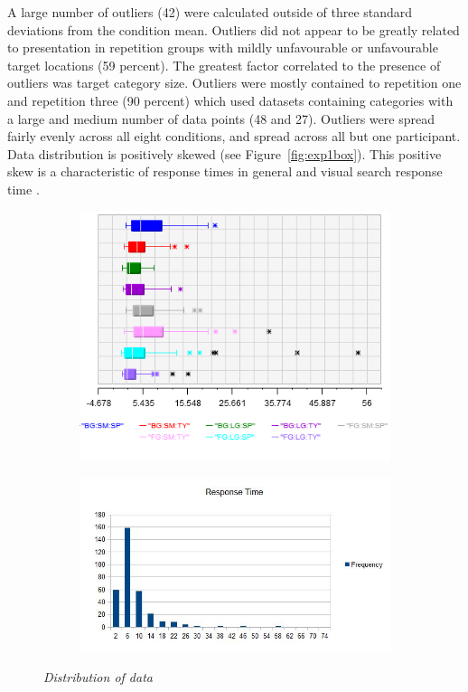 A large number of outliers (42) were calculated outside of three standard deviations from the condition mean. Outliers did not appear to be greatly related to presentation in repetition groups with mildly unfavourable or unfavourable target locations (59 percent). The greatest factor correlated to the presence of outliers was target category size. Outliers were mostly contained to repetition one and repetition three (90 percent) which used datasets containing categories with a large and medium number of data points  (48 and 27). Outliers were spread fairly evenly across all eight conditions, and spread across all but one participant. Data distribution is positively skewed (see Figure~\vref{fig:exp1box}). This positive skew is a characteristic of response times in general \citep[][]{luce86, zandt00} and visual search response time \citep{palmer11}. 


\begin{figure}[h!]
\centering
\begin{subfigure}{.5\textwidth}
	\centering
	\includegraphics[scale=0.60]{boxplot.png}
\end{subfigure}%
\begin{subfigure}{.5\textwidth}
  \centering
  \includegraphics[scale=0.40]{distribution.jpg}
\end{subfigure}
\caption{\textit{Distribution of data}}
\label{fig:exp1box}
\end{figure}


